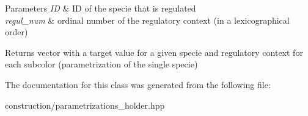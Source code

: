\begin{DoxyParams}{\-Parameters}
{\em \-I\-D} & \-I\-D of the specie that is regulated \\
\hline
{\em regul\-\_\-num} & ordinal number of the regulatory context (in a lexicographical order)\\
\hline
\end{DoxyParams}
\begin{DoxyReturn}{\-Returns}
vector with a target value for a given specie and regulatory context for each subcolor (parametrization of the single specie) 
\end{DoxyReturn}


\-The documentation for this class was generated from the following file\-:\begin{DoxyCompactItemize}
\item 
construction/parametrizations\-\_\-holder.\-hpp\end{DoxyCompactItemize}
